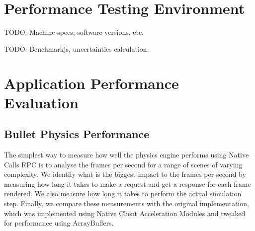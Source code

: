 \section{Performance Testing Environment} %
\label{sec:performance_testing_environment}
TODO: Machine specs, software versions, etc.

TODO: Benchmarkjs, uncertainties calculation.

\section{Application Performance Evaluation} %
\label{sec:application_performance_evaluation}
\subsection{Bullet Physics Performance} %
\label{sub:bullet_physics_performance}
The simplest way to measure how well the physics engine performs using Native Calls RPC is to analyse the frames per second for a range of scenes of varying complexity. We identify what is the biggest impact to the frames per second by measuring how long it takes to make a request and get a response for each frame rendered. We also measure how long it takes to perform the actual simulation step. Finally, we compare these measurements with the original implementation, which was implemented using Native Client Acceleration Modules and tweaked for performance using ArrayBuffers.

